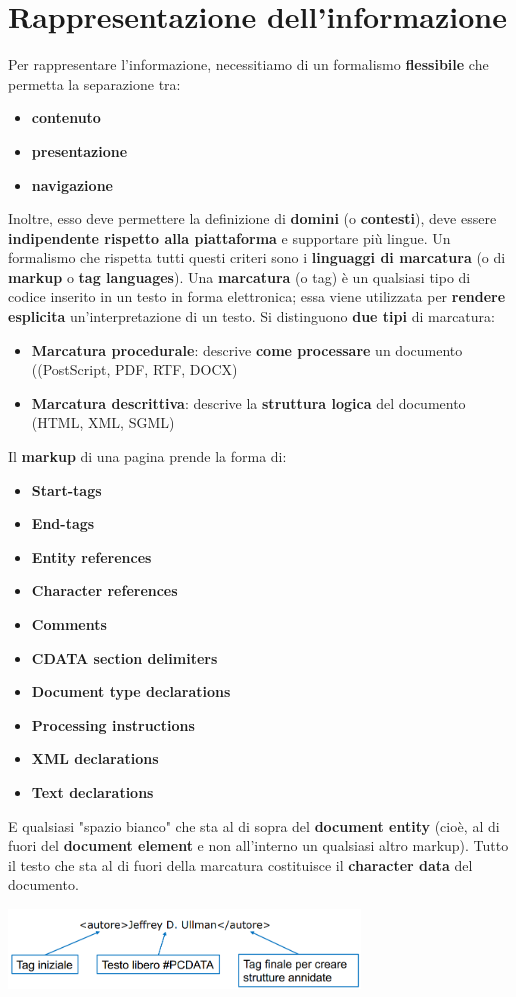 \documentclass[12pt]{article}
\begin{document}
\section{Rappresentazione dell'informazione}
Per rappresentare l'informazione, necessitiamo di un formalismo \textbf{flessibile} che permetta la separazione tra:
\begin{itemize}
    \item \textbf{contenuto}
    \item \textbf{presentazione}
    \item \textbf{navigazione}
\end{itemize}
Inoltre, esso deve permettere la definizione di \textbf{domini} (o \textbf{contesti}), deve essere
\textbf{indipendente rispetto alla piattaforma} e supportare più lingue. Un formalismo che rispetta tutti questi criteri sono i 
\textbf{linguaggi di marcatura} (o di \textbf{markup} o \textbf{tag languages}). Una \textbf{marcatura} (o tag) è un qualsiasi tipo di
codice inserito in un testo in forma elettronica; essa viene utilizzata per \textbf{rendere esplicita} un'interpretazione di un testo. \newline
Si distinguono \textbf{due tipi} di marcatura:
\begin{itemize}
    \item \textbf{Marcatura procedurale}: descrive \textbf{come processare} un documento ((PostScript, PDF, RTF, DOCX)
    \item \textbf{Marcatura descrittiva}: descrive la \textbf{struttura logica} del documento (HTML, XML, SGML)
\end{itemize}
Il \textbf{markup} di una pagina prende la forma di:
\begin{itemize}
    \item \textbf{Start-tags}
    \item \textbf{End-tags}
    \item \textbf{Entity references}
    \item \textbf{Character references}
    \item \textbf{Comments}
    \item \textbf{CDATA section delimiters}
    \item \textbf{Document type declarations}
    \item \textbf{Processing instructions}
    \item \textbf{XML declarations}
    \item \textbf{Text declarations}
\end{itemize}
E qualsiasi "spazio bianco" che sta al di sopra del \textbf{document entity} (cioè, al di fuori del \textbf{document element} e non all'interno un qualsiasi altro markup). \newline
Tutto il testo che sta al di fuori della marcatura costituisce il \textbf{character data} del documento.
\begin{center}
    \includegraphics[width = 0.70\textwidth]{Images/146.PNG}
\end{center}
\end{document}
